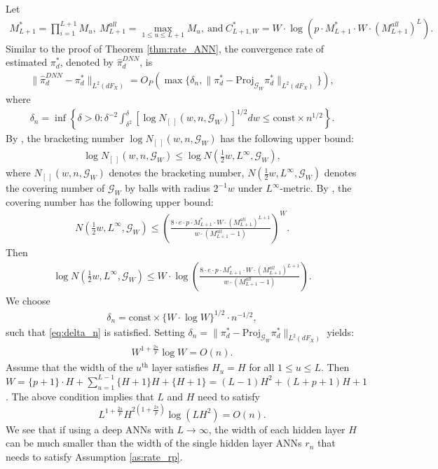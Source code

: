\documentclass[11pt]{article}
\numberwithin{equation}{section}
\begin{document}
Let
\begin{align*}
	M_{L+1}^*=\prod_{i=1}^{L+1}M_u,\ M_{L+1}^{all}=\max_{1\leq u\leq L+1} M_u, \ \text{and} \ C_{L+1,W}^*=W\cdot \log \left(p\cdot M_{L+1}^*\cdot W \cdot (M_{L+1}^{all})^{L} \right).
\end{align*}
Similar to the proof of Theorem \ref{thm:rate_ANN},  the convergence rate of estimated $\pi_d^*$, denoted by $\widehat{\pi}^{DNN}_d$, is
\begin{align*}
	\|\widehat{\pi}^{DNN}_d-\pi_d^*\|_{L^2(dF_X)}=O_P\left(\max\{\delta_n,\|\pi_d^*-\text{Proj}_{\mathcal{G}_W}\pi_d^*\|_{L^2(dF_X)}\}\right),
\end{align*}
where
\begin{align}\label{eq:delta_n}
	\delta_n=\inf \left\{ \delta>0:\delta^{-2}\int_{\delta^2}^{\delta}[\log N_{[\ ]}(w,n,\mathcal{G}_W)]^{1/2}dw\leq \text{const}\times n^{1/2} \right\}.
\end{align}
By \cite{van1998asymptotic}, the bracketing number $\log N_{[\ ]}\left(w,n,\mathcal{G}_W\right)$ has the following upper bound:
\begin{align*}
	\log N_{[\ ]}\left(w,n,\mathcal{G}_W\right)\leq \log N\left(\frac{1}{2}w,L^{\infty},\mathcal{G}_W\right),
\end{align*}
where $N_{[\ ]}(w,n,\mathcal{G}_W)$ denotes the bracketing number,  $N\left(\frac{1}{2}w,L^{\infty},\mathcal{G}_W\right)$ denotes the  covering number of $\mathcal{G}_W$ by balls with radius $2^{-1}w$ under $L^{\infty}$-metric. By \citet[Theorem 14.5]{anthony2009neural}, the covering number has the following upper bound:
\begin{align*}
	N\left(\frac{1}{2}w,L^{\infty},\mathcal{G}_W\right)\leq \left(\frac{8\cdot e\cdot p\cdot M^*_{L+1}\cdot W\cdot (M_{L+1}^{all})^{L+1}}{w\cdot (M_{L+1}^{all}-1)}\right)^{W}.
\end{align*}
Then
\begin{align*}
	\log N\left(\frac{1}{2}w,L^{\infty},\mathcal{G}_W\right)\leq W \cdot \log \left(\frac{8\cdot e\cdot p\cdot M^*_{L+1}\cdot W\cdot (M_{L+1}^{all})^{L+1}}{w\cdot (M_{L+1}^{all}-1)}\right).
\end{align*}
We choose
\begin{align*}
	\delta_n=\text{const}\times \{W\cdot \log W\}^{1/2}\cdot n^{-1/2},
\end{align*}
such that \eqref{eq:delta_n} is satisfied.  Setting
$\delta_n=\|\pi_d^*-\text{Proj}_{\mathcal{G}_W}\pi_d^*\|_{L^2(dF_X)}$ yields:
\begin{align*}
	W^{1+\frac{2s}{p}}\log W=O(n).
\end{align*}
Assume that the width of the $u^{\text{th}}$ layer satisfies $H_{u}=H$ for
all $1\leq u\leq L$. Then $W=\{p+1\}\cdot H+\sum_{u=1}^{L-1}\{H+1\}H+\{H+1\}=(L-1)H^2+(L+p+1)H+1$. The above
condition implies that $L$ and $H$ need to satisfy
\begin{equation*}
	L^{1+\frac{2s}{p}}H^{2(1+\frac{2s}{p})}\log (LH^{2})=O(n).
\end{equation*}%
We see that if using a deep ANNs with $L\rightarrow \infty $,  the width of
each hidden layer $H$ can be much smaller than the width of the single
hidden layer ANNs $r_{n}$ that needs to satisfy Assumption \ref{as:rate_rp}.
\end{document}
